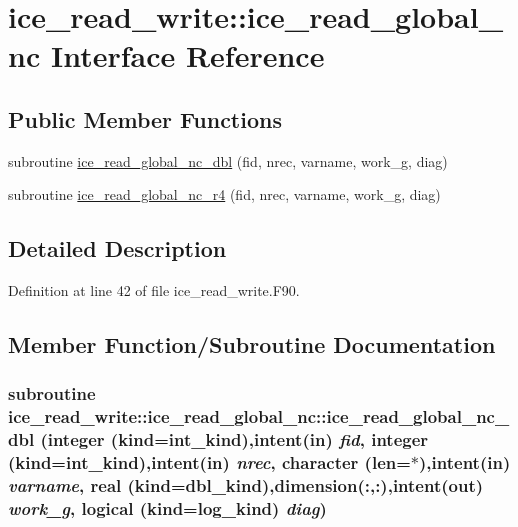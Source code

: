 \hypertarget{interfaceice__read__write_1_1ice__read__global__nc}{
\section{ice\_\-read\_\-write::ice\_\-read\_\-global\_\-nc Interface Reference}
\label{interfaceice__read__write_1_1ice__read__global__nc}
}
\subsection*{Public Member Functions}
\begin{DoxyCompactItemize}
\item 
subroutine \hyperlink{interfaceice__read__write_1_1ice__read__global__nc_aee6f7faec531b262c0c0e2ea85df7726}{ice\_\-read\_\-global\_\-nc\_\-dbl} (fid, nrec, varname, work\_\-g, diag)
\item 
subroutine \hyperlink{interfaceice__read__write_1_1ice__read__global__nc_ac044f68c44fe7f915c3761333ff38fa4}{ice\_\-read\_\-global\_\-nc\_\-r4} (fid, nrec, varname, work\_\-g, diag)
\end{DoxyCompactItemize}


\subsection{Detailed Description}


Definition at line 42 of file ice\_\-read\_\-write.F90.

\subsection{Member Function/Subroutine Documentation}
\hypertarget{interfaceice__read__write_1_1ice__read__global__nc_aee6f7faec531b262c0c0e2ea85df7726}{
\subsubsection[{ice\_\-read\_\-global\_\-nc\_\-dbl}]{\setlength{\rightskip}{0pt plus 5cm}subroutine ice\_\-read\_\-write::ice\_\-read\_\-global\_\-nc::ice\_\-read\_\-global\_\-nc\_\-dbl (integer (kind=int\_\-kind),intent(in) {\em fid}, \/  integer (kind=int\_\-kind),intent(in) {\em nrec}, \/  character (len=$\ast$),intent(in) {\em varname}, \/  real (kind=dbl\_\-kind),dimension(:,:),intent(out) {\em work\_\-g}, \/  logical (kind=log\_\-kind) {\em diag})}}
\label{interfaceice__read__write_1_1ice__read__global__nc_aee6f7faec531b262c0c0e2ea85df7726}



